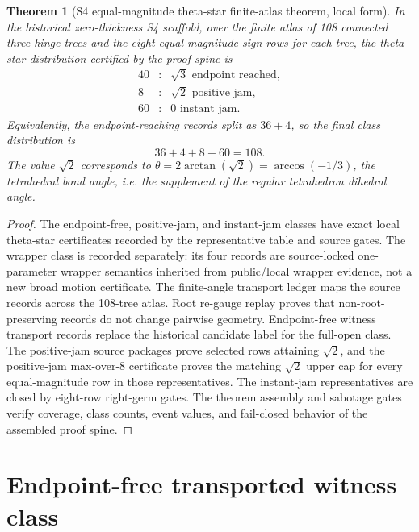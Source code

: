 \documentclass[11pt,a4paper]{article}
\newtheorem{theorem}{Theorem}[section]
\theoremstyle{definition}
\theoremstyle{remark}
\begin{document}
\begin{theorem}[S4 equal-magnitude theta-star finite-atlas theorem, local form]
In the historical zero-thickness S4 scaffold, over the finite atlas of 108 connected three-hinge trees and the eight equal-magnitude sign rows for each tree, the theta-star distribution certified by the proof spine is
\[
\begin{array}{rcl}
  40 &:& \sqrt{3} \text{ endpoint reached},\\
  8  &:& \sqrt{2} \text{ positive jam},\\
  60 &:& 0 \text{ instant jam}.
\end{array}
\]
Equivalently, the endpoint-reaching records split as \(36+4\), so the final class distribution is
\[
  36+4+8+60=108.
\]
The value \(\sqrt{2}\) corresponds to \(\theta = 2\arctan(\sqrt{2}) = \arccos(-1/3)\), the tetrahedral bond angle, i.e. the supplement of the regular tetrahedron dihedral angle.
\end{theorem}

\begin{proof}
The endpoint-free, positive-jam, and instant-jam classes have exact local theta-star certificates recorded by the representative table and source gates.  The wrapper class is recorded separately: its four records are source-locked one-parameter wrapper semantics inherited from public/local wrapper evidence, not a new broad motion certificate.  The finite-angle transport ledger maps the source records across the 108-tree atlas.  Root re-gauge replay proves that non-root-preserving records do not change pairwise geometry.  Endpoint-free witness transport records replace the historical candidate label for the full-open class.  The positive-jam source packages prove selected rows attaining \(\sqrt{2}\), and the positive-jam max-over-8 certificate proves the matching \(\sqrt{2}\) upper cap for every equal-magnitude row in those representatives.  The instant-jam representatives are closed by eight-row right-germ gates.  The theorem assembly and sabotage gates verify coverage, class counts, event values, and fail-closed behavior of the assembled proof spine.
\end{proof}



\section{Endpoint-free transported witness class}
\end{document}
